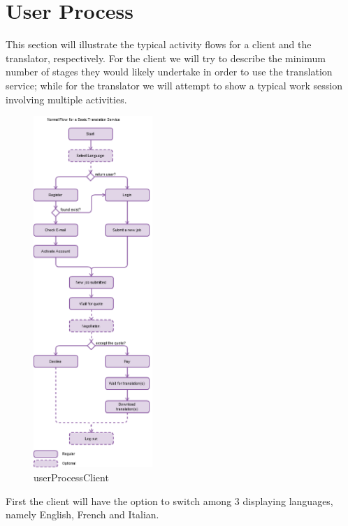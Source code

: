 \documentclass{l3proj}
\begin{document}
\section{User Process}
\label{sect:user-process}

This section will illustrate the typical activity flows for a client and the translator, respectively.
For the client we will try to describe the minimum number of stages they would likely
undertake in order to use the translation service; while for the translator we
will attempt to show a typical work session involving multiple activities.

\newpage
\begin{figure}
\vspace{-20pt}
  \begin{center}
    \includegraphics[width=0.4\textwidth]{images/userProcessClient.png}
  \end{center}
  \caption{userProcessClient}
\vspace{-60pt}
\end{figure}

First the client will have the option to switch among 3 displaying languages,
namely English, French and Italian. \\
\end{document}
